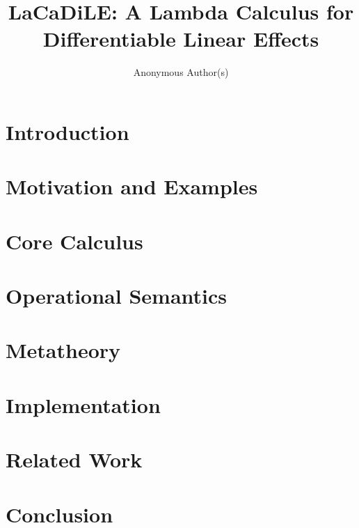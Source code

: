 \documentclass[acmsmall,screen,review,anonymous,nonacm]{acmart}
\title{LaCaDiLE: A Lambda Calculus for Differentiable Linear Effects}
\author{Anonymous Author(s)}
\begin{document}
\begin{abstract}
\end{abstract}
\maketitle

\section{Introduction}\label{sec:intro}

\section{Motivation and Examples}\label{sec:motivation}

\section{Core Calculus}\label{sec:calculus}

\section{Operational Semantics}\label{sec:opsem}

\section{Metatheory}\label{sec:metatheory}

\section{Implementation}\label{sec:impl}

\section{Related Work}\label{sec:related}

\section{Conclusion}\label{sec:conclusion}



\end{document}

